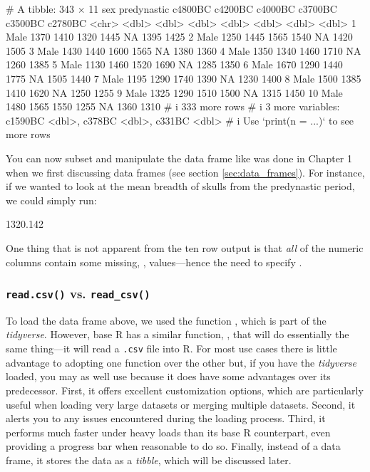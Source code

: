 \begin{outR}
# A tibble: 343 × 11
   sex   predynastic c4800BC c4200BC c4000BC c3700BC c3500BC c2780BC
   <chr>       <dbl>   <dbl>   <dbl>   <dbl>   <dbl>   <dbl>   <dbl>
 1 Male         1370    1410    1320    1445      NA    1395    1425
 2 Male         1250    1445    1565    1540      NA    1420    1505
 3 Male         1430    1440    1600    1565      NA    1380    1360
 4 Male         1350    1340    1460    1710      NA    1260    1385
 5 Male         1130    1460    1520    1690      NA    1285    1350
 6 Male         1670    1290    1440    1775      NA    1505    1440
 7 Male         1195    1290    1740    1390      NA    1230    1400
 8 Male         1500    1385    1410    1620      NA    1250    1255
 9 Male         1325    1290    1510    1500      NA    1315    1450
10 Male         1480    1565    1550    1255      NA    1360    1310
# i 333 more rows
# i 3 more variables: c1590BC <dbl>, c378BC <dbl>, c331BC <dbl>
# i Use `print(n = ...)` to see more rows
\end{outR}

You can now subset and manipulate the data frame  like was done in Chapter 1 when we first discussing data frames (see section \ref{sec:data_frames}). For instance, if we wanted to look at the mean breadth of skulls from the predynastic period, we could simply run:

\begin{outR}
[1] 1320.142
\end{outR}

\noindent
One thing that is not apparent from the ten row output is that \textit{all} of the numeric columns contain some missing, , values—hence the need to specify .

\subsubsection{\texttt{read.csv()} vs. \texttt{read\_csv()}}

To load the  data frame above, we used the function , which is part of the \textit{tidyverse}. However, base R has a similar function, , that will do essentially the same thing—it will read a \texttt{.csv} file into R. For most use cases there is little advantage to adopting one function over the other but, if you have the \textit{tidyverse} loaded, you may as well use  because it does have some advantages over its predecessor. First, it offers excellent customization options, which are particularly useful when loading very large datasets or merging multiple datasets. Second, it alerts you to any issues encountered during the loading process. Third, it performs much faster under heavy loads than its base R counterpart, even providing a progress bar when reasonable to do so. Finally, instead of a data frame, it stores the data as a \textit{tibble}, which will be discussed later.


